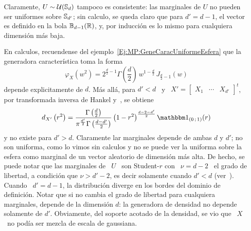 \begin{ejemplo}
\label{Ej:MP:UniformeCnt}
%
  Claramente, $U \sim \mathcal{U}(\mathbb{S}_d)$ tampoco es consistente: las marginales de $U$
  no pueden  ser uniformes sobre $\mathbb{S}_{d'}$;  sin calculo, se  queda claro que
  para $d' = d-1$, el vector es definido en la bola $\mathbb{B}_{d-1}(\mathbb{R})$, y, por
  inducci\'on es lo mismo para cualquiera dimensi\'on m\'as baja.

  En  calculos, recuendense del  ejemplo~\ref{Ej:MP:GeneCaracUniformeEsfera} que
  la generadora caracter\'istica toma la forma
  \[
  \varphi_X\left(  w^2  \right)  =  2^{\frac{d}{2}-1}  \Gamma\left(  \frac{d}{2}
  \right) \, w^{1-\frac{d}{2}} \, J_{\frac{d}{2}-1}\left( w \right)
  \]
  depende  explicitamente  de $d$.  M\'as  all\'a,  para $d'  <  d$  \  y \  $X'
  =  \begin{bmatrix} X_1 &  \cdots &  X_{d'} \end{bmatrix}^t$,  por transformada
  inversa de Hankel y~\cite[Ec.~6.575-1]{GraRyz15}, se obtiene
  \[
  d_{X'}\left(     r^2      \right)     =     \frac{\Gamma\left(     \frac{d}{2}
    \right)}{\pi^{\frac{d'}{2}} \Gamma\left( \frac{d-d'}{2}  \right)} \left( 1 -
    r^2 \right)^{\frac{d-2-d'}{2}} \un_{(0 \; 1)}(r)
  \]
  y no existe para  $d' > d$.  Claramente lar marginales depende  de ambas $d$ y
  $d'$;  no son  uniforma, como  lo vimos  sin  calculos y  no se  puede ver  la
  uniforma sobre la  esfera como marginal de un  vector aleatorio de dimensi\'on
  m\'as  alta.  De  hecho, se  puede notar  que las  marginales de  \ $U$  \ son
  Student-$r$ con \ $\nu = d-2$ \ el grado de libertad, a condici\'on que $\nu >
  d'-2$, es decir solamente cuando  $d' < d$ (ver~\cite[\& ref.]{Zoz12}). Cuando
  \  $d'  =  d-1$, la  distribuci\'on  diverge  en  los  bordes del  dominio  de
  definici\'on.  Notar  que si  no cambia el  grado de libertad  para cualquiera
  marginales,  depende de  la  dimensi\'on  $d$: la  generadora  de densidad  no
  depende solamente de $d'$.  Obviamente, del soporte acotado de la densidad, se
  vio que \ $X$ \ no pod\'ia ser mezcla de escala de gaussiana.
\end{ejemplo}

